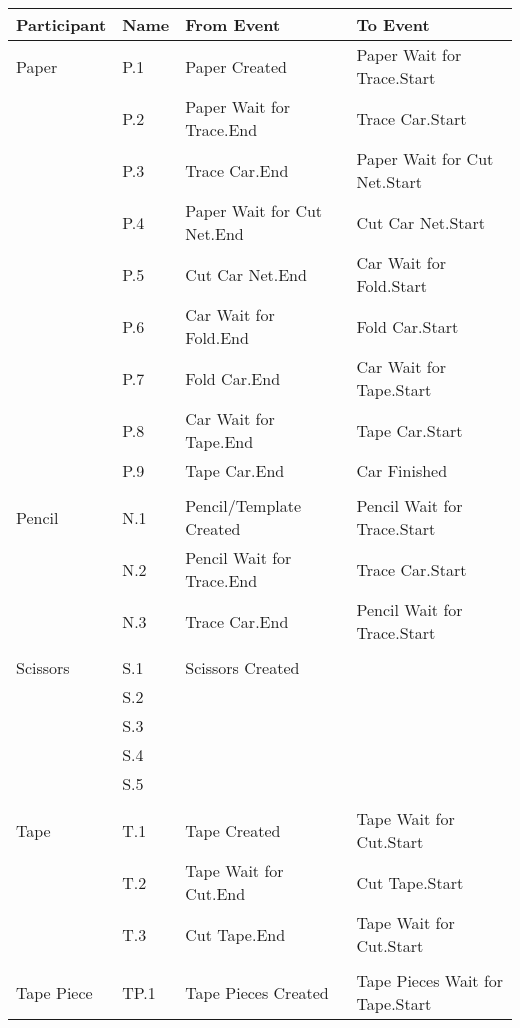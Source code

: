 \begin{longtable}{p{2.4cm}>{\raggedright\arraybackslash}p{1.2cm}>{\raggedright\arraybackslash}p{5.9cm}>{\raggedright\arraybackslash}p{5.9cm}}
\toprule
Participant & Name & From Event & To Event       \\ \midrule
\endhead
Paper & P.1 & Paper Created & Paper Wait for Trace.Start \\
      & P.2 & Paper Wait for Trace.End & Trace Car.Start \\
      & P.3 & Trace Car.End & Paper Wait for Cut Net.Start \\
      & P.4 & Paper Wait for Cut Net.End & Cut Car Net.Start \\
      & P.5 & Cut Car Net.End & Car Wait for Fold.Start \\
      & P.6 & Car Wait for Fold.End & Fold Car.Start \\
      & P.7 & Fold Car.End & Car Wait for Tape.Start \\
      & P.8 & Car Wait for Tape.End & Tape Car.Start \\
      & P.9 & Tape Car.End & Car Finished \\
      &      &              &              \\
Pencil & N.1 & Pencil/Template Created & Pencil Wait for Trace.Start \\
       & N.2 & Pencil Wait for Trace.End & Trace Car.Start \\
       & N.3 & Trace Car.End & Pencil Wait for Trace.Start \\
       &      &              &              \\
Scissors & S.1 & Scissors Created             &              \\
       & S.2   &              &              \\
       & S.3   &              &              \\
       & S.4   &              &              \\
       & S.5   &              &              \\
       &      &              &              \\
Tape   & T.1 & Tape Created & Tape Wait for Cut.Start \\
       & T.2 & Tape Wait for Cut.End & Cut Tape.Start \\
       & T.3 & Cut Tape.End & Tape Wait for Cut.Start \\
       &      &              &              \\
Tape Piece & TP.1 & Tape Pieces Created & Tape Pieces Wait for Tape.Start \\

\end{longtable}
